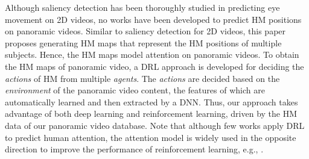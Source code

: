 \documentclass[10pt,journal,compsoc]{IEEEtran}
\begin{document}
Although saliency detection has been thoroughly studied in predicting eye movement on 2D videos, no works have been developed to predict HM positions on panoramic videos.
Similar to saliency detection for 2D videos, this paper proposes generating HM maps that represent the HM positions of multiple subjects. Hence, the HM maps model attention on panoramic videos. To obtain the HM maps of panoramic video, a DRL approach is developed for deciding the \textit{actions} of HM from multiple \textit{agents}. The \textit{actions} are decided based on the \textit{environment} of the panoramic video content, the features of which are automatically learned and then extracted by a DNN. Thus, our approach takes advantage of both deep learning and reinforcement learning, driven by the HM data of our panoramic video database.
Note that although few works apply DRL to predict human attention, the attention model is widely used in the opposite direction to improve the performance of reinforcement learning, e.g., \cite{minut2001reinforcement, mnih2014recurrent, jaderberg2016reinforcement, wang2016dueling}.
\end{document}
